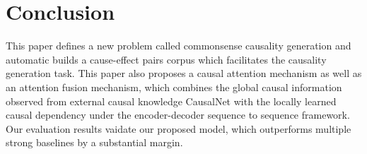 \section{Conclusion}
This paper defines a new problem called commonsense causality generation and automatic builds a cause-effect
pairs corpus which facilitates the causality generation task.
This paper also proposes a causal attention mechanism
as well as an attention fusion mechanism, 
which combines the global causal information observed from external causal knowledge CausalNet with the locally learned causal dependency under the encoder-decoder sequence to sequence framework.
Our evaluation results vaidate our proposed model,
which outperforms multiple strong baselines by a substantial margin.